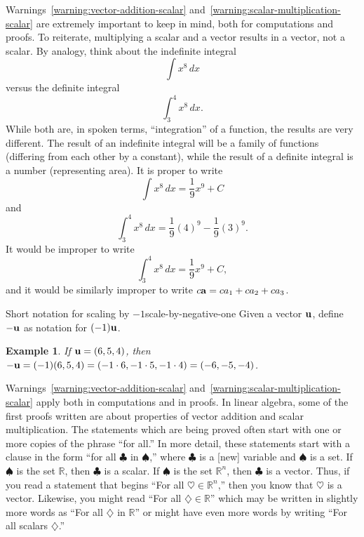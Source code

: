 \documentclass{book}
\newcounter{ekcounter}%
\theoremstyle{ekimcustom}
\newtheorem{example}[ekcounter]{Example}
\begin{document}
Warnings~\ref{warning:vector-addition-scalar} and~\ref{warning:scalar-multiplication-scalar} are extremely important to keep in mind, both for computations and proofs. To reiterate, multiplying a scalar and a vector results in a vector, not a scalar. By analogy, think about the indefinite integral
\[ \int x^8 \,dx\]
versus the definite integral
\[ \int_3^4 x^8 \,dx.\]
While both are, in spoken terms, ``integration'' of a function, the results are very different. The result of an indefinite integral will be a family of functions (differing from each other by a constant), while the result of a definite integral is a number (representing area). It is proper to write
\[ \int x^8 \,dx = \frac19x^9 + C\]
and
\[ \int_3^4 x^8 \,dx = \frac19(4)^9 - \frac19(3)^9.\]
It would be improper to write
\[ \int_3^4 x^8 \,dx = \frac19x^9 + C,\]
and it would be similarly improper to write $c{\bf a} = ca_1+ca_2+ca_3$.


\begin{bdefinition}{Short notation for scaling by $-1$}{scale-by-negative-one}
Given a vector ${\bf u}$, define $-{\bf u}$ as notation for $(-1){\bf u}$.
\end{bdefinition}
\begin{example}
If ${\bf u} = (6,5,4)$, then $-{\bf u}=(-1)(6,5,4)=(-1\cdot6,-1\cdot5,-1\cdot4)=(-6,-5,-4)$.
\end{example}

Warnings~\ref{warning:vector-addition-scalar} and~\ref{warning:scalar-multiplication-scalar} apply both in computations and in proofs. In linear algebra, some of the first proofs written are about properties of vector addition and scalar multiplication. The statements which are being proved often start with one or more copies of the phrase ``for all.'' In more detail, these statements start with a clause in the form ``for all $\clubsuit$ in $\spadesuit$,'' where $\clubsuit$ is a [new] variable and $\spadesuit$ is a set. If $\spadesuit$ is the set $\mathbb{R}$, then $\clubsuit$ is a scalar. If $\spadesuit$ is the set $\mathbb{R}^n$, then $\clubsuit$ is a vector. Thus, if you read a statement that begins ``For all $\heartsuit \in \mathbb{R}^n$,'' then you know that $\heartsuit$ is a vector. Likewise, you might read ``For all $\diamondsuit \in \mathbb{R}$'' which may be written in slightly more words as ``For all $\diamondsuit$ in $\mathbb{R}$'' or might have even more words by writing ``For all scalars $\diamondsuit$.''
\end{document}
